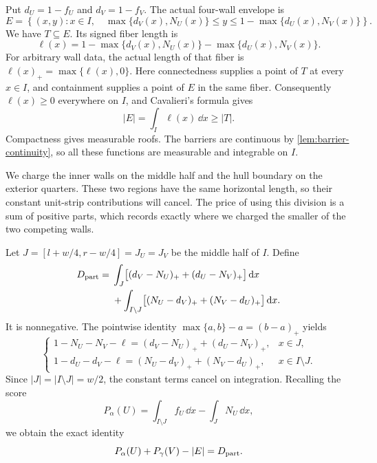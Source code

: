 Put $d_U=1-f_U$ and $d_V=1-f_V$. The actual four-wall envelope is
\begin{equation}\label{eq:physical-envelope}
 E=\left\{(x,y):x\in I,\quad
    \max\{d_V(x),N_U(x)\}\le y
    \le1-\max\{d_U(x),N_V(x)\}\right\}.
\end{equation}
We have $T\subseteq E$. Its signed fiber length is
\begin{equation}\label{eq:signed-length}
 \ell(x)=1-\max\{d_V(x),N_U(x)\}
             -\max\{d_U(x),N_V(x)\}.
\end{equation}
For arbitrary wall data, the actual length of that fiber is
$\ell(x)_+=\max\{\ell(x),0\}$. Here connectedness supplies a point
of $T$ at every $x\in I$, and containment supplies a point of $E$
in the same fiber. Consequently $\ell(x)\ge0$ everywhere on $I$,
and Cavalieri's formula gives
\begin{equation}\label{eq:envelope-area}
 |E|=\int_I\ell(x)\,\dd x\ge|T|.
\end{equation}
Compactness gives measurable roofs. The barriers are continuous by \cref{lem:barrier-continuity},
so all these functions are measurable and integrable on $I$.

We charge the inner walls on the middle half and the hull boundary on
the exterior quarters. These two regions have the same horizontal
length, so their constant unit-strip contributions will cancel. The
price of using this division is a sum of positive parts, which records
exactly where we charged the smaller of the two competing walls.

Let $J=[l+w/4,r-w/4]=J_U=J_V$ be the middle half of $I$. Define
\begin{align}\label{eq:partition-defect}
 D_{\rm part}={}&
 \int_J\bigl[(d_V-N_U)_++(d_U-N_V)_+\bigr]\,\mathrm{d} x\notag\\
 &+\int_{I\setminus J}
       \bigl[(N_U-d_V)_++(N_V-d_U)_+\bigr]\,\mathrm{d} x.
\end{align}
It is nonnegative. The pointwise identity
$\max\{a,b\}-a=(b-a)_+$ yields
\[
 \begin{cases}
  1-N_U-N_V-\ell=(d_V-N_U)_++(d_U-N_V)_+,&x\in J,\\
  1-d_U-d_V-\ell=(N_U-d_V)_++(N_V-d_U)_+,&x\in I\setminus J.
 \end{cases}
\]
Since $|J|=|I\setminus J|=w/2$, the constant terms cancel on
integration. Recalling the score
\[
 P_\alpha(U)=\int_{I\setminus J}f_U\,\dd x
                         -\int_J N_U\,\dd x,
\]
we obtain the exact identity
\begin{equation}\label{eq:score-envelope-defect}
 P_\alpha(U)+P_\gamma(V)-|E|=D_{\rm part}.
\end{equation}

